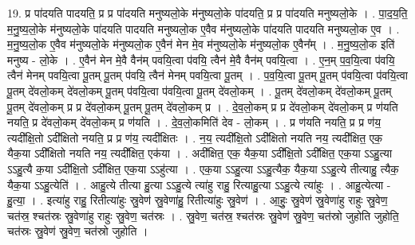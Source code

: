 \documentclass[17pt]{extarticle}
\begin{document}
19. प्र पा॑दयति पादयति॒ प्र प्र पा॑दयति मनुष्यलो॒के म॑नुष्यलो॒के पा॑दयति॒ प्र प्र पा॑दयति मनुष्यलो॒के । . पा॒द॒य॒ति॒ म॒नु॒ष्य॒लो॒के म॑नुष्यलो॒के पा॑दयति पादयति मनुष्यलो॒क ए॒वैव म॑नुष्यलो॒के पा॑दयति पादयति मनुष्यलो॒क ए॒व । . म॒नु॒ष्य॒लो॒क ए॒वैव म॑नुष्यलो॒के म॑नुष्यलो॒क ए॒वैन॑ मेन मे॒व म॑नुष्यलो॒के म॑नुष्यलो॒क ए॒वैन᳚म् । . म॒नु॒ष्य॒लो॒क इति॑ मनुष्य - लो॒के । . ए॒वैन॑ मेन मे॒वै वैन॑म् पवयि॒त्वा प॑वयि॒ त्वैन॑ मे॒वै वैन॑म् पवयि॒त्वा । . ए॒न॒म् प॒व॒यि॒त्वा प॑वयि॒ त्वैन॑ मेनम् पवयि॒त्वा पू॒तम् पू॒तम् प॑वयि॒ त्वैन॑ मेनम् पवयि॒त्वा पू॒तम् । . प॒व॒यि॒त्वा पू॒तम् पू॒तम् प॑वयि॒त्वा प॑वयि॒त्वा पू॒तम् दे॑वलो॒कम् दे॑वलो॒कम् पू॒तम् प॑वयि॒त्वा प॑वयि॒त्वा पू॒तम् दे॑वलो॒कम् । . पू॒तम् दे॑वलो॒कम् दे॑वलो॒कम् पू॒तम् पू॒तम् दे॑वलो॒कम् प्र प्र दे॑वलो॒कम् पू॒तम् पू॒तम् दे॑वलो॒कम् प्र । . दे॒व॒लो॒कम् प्र प्र दे॑वलो॒कम् दे॑वलो॒कम् प्र ण॑यति नयति॒ प्र दे॑वलो॒कम् दे॑वलो॒कम् प्र ण॑यति । . दे॒व॒लो॒कमिति॑ देव - लो॒कम् । . प्र ण॑यति नयति॒ प्र प्र ण॑य॒ त्यदी᳚क्षि॒तो ऽदी᳚क्षितो नयति॒ प्र प्र ण॑य॒ त्यदी᳚क्षितः । . न॒य॒ त्यदी᳚क्षि॒तो ऽदी᳚क्षितो नयति नय॒ त्यदी᳚क्षित॒ एक॒ यैक॒या ऽदी᳚क्षितो नयति नय॒ त्यदी᳚क्षित॒ एक॑या । . अदी᳚क्षित॒ एक॒ यैक॒या ऽदी᳚क्षि॒तो ऽदी᳚क्षित॒ एक॒या ऽऽहु॒त्या ऽऽहु॒त्यै क॒या ऽदी᳚क्षि॒तो ऽदी᳚क्षित॒ एक॒या ऽऽहु॑त्या । . एक॒या ऽऽहु॒त्या ऽऽहु॒त्यैक॒ यैक॒या ऽऽहु॒त्ये तीत्याहु॒ त्यैक॒ यैक॒या ऽऽहु॒त्येति॑ । . आहु॒त्ये तीत्या हु॒त्या ऽऽहु॒त्ये त्या॑हु राहु॒ रित्याहु॒त्या ऽऽहु॒त्ये त्या॑हुः । . आहु॒त्येत्या - हु॒त्या॒ । . इत्या॑हु राहु॒ रितीत्या॑हुः स्रु॒वेण॑ स्रु॒वेणा॑हु॒ रितीत्या॑हुः स्रु॒वेण॑ । . आ॒हुः॒ स्रु॒वेण॑ स्रु॒वेणा॑हु राहुः स्रु॒वेण॒ चत॑स्र॒ श्चत॑स्रः स्रु॒वेणा॑हु राहुः स्रु॒वेण॒ चत॑स्रः । . स्रु॒वेण॒ चत॑स्र॒ श्चत॑स्रः स्रु॒वेण॑ स्रु॒वेण॒ चत॑स्रो जुहोति जुहोति॒ चत॑स्रः स्रु॒वेण॑ स्रु॒वेण॒ चत॑स्रो जुहोति । \newline
\end{document}
